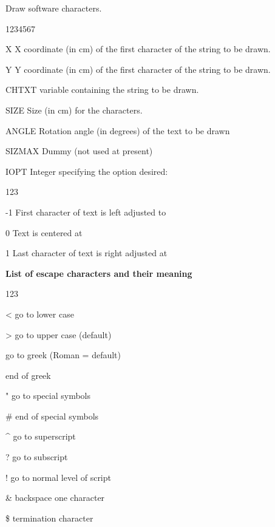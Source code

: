 \Action
Draw software characters.
\Pdesc
\begin{DLtt}{1234567}
\item[X]      X coordinate (in cm) of the first character of the string to be
              drawn.
\item[Y]      Y coordinate (in cm) of the first character of the string to be
              drawn.
\item[CHTXT]  \CHARACTER{} variable containing the string to be drawn.
\item[SIZE]   Size (in cm) for the characters.
\item[ANGLE]  Rotation angle (in degrees) of the text to be drawn
\item[SIZMAX] Dummy (not used at present)
\item[IOPT]   Integer specifying the option desired:
\begin{DLtt}{123}
\item[-1]           First character of text is left adjusted to 
\item[\phantom{0}0] Text is centered at 
\item[\phantom{0}1] Last character of text is right adjusted at 
\end{DLtt}
\end{DLtt}
{\bf List of escape characters and their meaning }
\begin{DLtt}{123}
\item[<]    go to lower case
\item[>]    go to upper case (default)
\item[\lsb] go to greek (Roman = default)
\item[\rsb] end of greek
\item["]    go to special symbols
\item[\#]   end of special symbols
\item[\^]   go to superscript
\item[?]    go to subscript
\item[!]    go to normal level of script
\item[\&]   backspace one character
\item[\$]   termination character
\end{DLtt}
\Remarks
